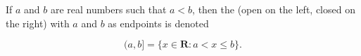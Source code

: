 If $a$ and $b$ are real numbers such that $a < b$, then the  (open on the left, closed on the right) with $a$ and $b$ as endpoints is denoted

$$(a, b] = \{x \in \mathbf{R} : a < x \leq b\}.$$
